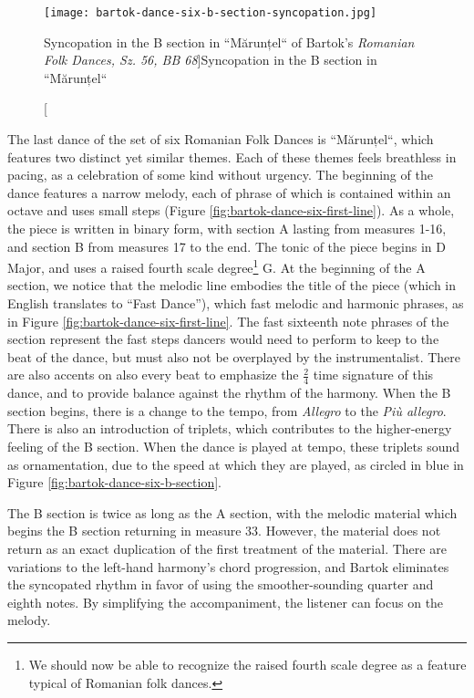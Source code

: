 \begin{figure}
  \centering
  \texttt{[image: bartok-dance-six-b-section-syncopation.jpg]}
  \caption[Syncopation in the B section in ``Mărunțel`` of Bartok's \textit{Romanian Folk Dances, Sz. 56, BB 68}]{Syncopation in the B section in ``Mărunțel``}
  \label{fig:bartok-dance-six-b-section-syncopation}
\end{figure}


The last dance of the set of six Romanian Folk Dances is ``Mărunțel``, which features two distinct yet similar themes. Each of these themes feels breathless in pacing, as a celebration of some kind without urgency. The beginning of the dance features a narrow melody, each of phrase of which is contained within an octave and uses small steps (Figure \ref{fig:bartok-dance-six-first-line}\autocite{Lung_2016}). As a whole, the piece is written in binary form, with section A lasting from measures 1-16, and section B from measures 17 to the end. The tonic of the piece begins in D Major, and uses a raised fourth scale degree\footnote{We should now be able to recognize the raised fourth scale degree as a feature typical of Romanian folk dances.} G\musSharp{}. At the beginning of the A section, we notice that the melodic line embodies the title of the piece (which in English translates to ``Fast Dance''), which fast melodic and harmonic phrases, as in Figure \ref{fig:bartok-dance-six-first-line}\autocite{Lung_2016}. The fast sixteenth note phrases of the section represent the fast steps dancers would need to perform to keep to the beat of the dance, but must also not be overplayed by the instrumentalist. There are also accents on also every beat to emphasize the $\frac{2}{4}$ time signature of this dance, and to provide balance against the rhythm of the harmony. When the B section begins, there is a change to the tempo, from \textit{Allegro} to the \textit{Più allegro}. There is also an introduction of triplets, which contributes to the higher-energy feeling of the B section. When the dance is played at tempo, these triplets sound as ornamentation, due to the speed at which they are played, as circled in blue in Figure \ref{fig:bartok-dance-six-b-section}\autocite{Lung_2016}. 

The B section is twice as long as the A section, with the melodic material which begins the B section returning in measure 33. However, the material does not return as an exact duplication of the first treatment of the material. There are variations to the left-hand harmony's chord progression, and Bartok eliminates the syncopated rhythm in favor of using the smoother-sounding quarter and eighth notes. By simplifying the accompaniment, the listener can focus on the melody.